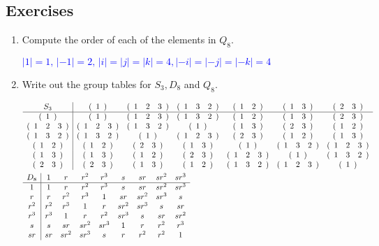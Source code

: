 \documentclass[10pt,a4paper]{report}
\newcommand{\BLUE}[1]{\textcolor{blue}{#1}}
\begin{document}
\subsection{Exercises}

\begin{enumerate}
	\item Compute the order of each of the elements in $Q_8$.
	
	\BLUE{$|1|=1,\,|-1|=2,\,|i|=|j|=|k|=4,|-i|=|-j|=|-k|=4$
	}
	
	\item Write out the group tables for $S_3, D_8$ and $Q_8$.
	
	\BLUE{
	\begin{align*}
		&\begin{array}{c|cccccc}
			S_3& \CYCLE{1} & \CYCLE{1&2&3} & \CYCLE{1&3&2} &\CYCLE{1&2}&\CYCLE{1&3}& \CYCLE{2&3} \\
			\hline
			\CYCLE{1} & \CYCLE{1} &\CYCLE{1&2&3} & \CYCLE{1&3&2} &\CYCLE{1&2}&\CYCLE{1&3}& \CYCLE{2&3} \\
			\CYCLE{1&2&3} & \CYCLE{1&2&3} & \CYCLE{1&3&2} & \CYCLE{1} & \CYCLE{1&3} & \CYCLE{2&3} & \CYCLE{1&2} \\
			\CYCLE{1&3&2} & \CYCLE{1&3&2} & \CYCLE{1} &\CYCLE{1&2&3} &\CYCLE{2&3} &\CYCLE{1&2} & \CYCLE{1&3}\\
			\CYCLE{1&2} & \CYCLE{1&2} & \CYCLE{2&3} & \CYCLE{1&3} & \CYCLE{1} &\CYCLE{1&3&2} & \CYCLE{1&2&3}\\
			\CYCLE{1&3} & \CYCLE{1&3} & \CYCLE{1&2} & \CYCLE{2&3} & \CYCLE{1&2&3} &\CYCLE{1}& \CYCLE{1&3&2}\\
			\CYCLE{2&3} & \CYCLE{2&3} & \CYCLE{1&3} & \CYCLE{1&2}& \CYCLE{1&3&2} &\CYCLE{1&2&3} & \CYCLE{1}
		\end{array}\\
		&\begin{array}{c|cccccccc}
			D_8 & 1     & r    & r^2  & r^3  & s   & sr   & sr^2 & sr^3\\
			\hline
			1    & 1    & r    & r^2  & r^3  & s   & sr   & sr^2  & sr^3\\ 
			r    & r    & r^2  & r^3  & 1    & sr  & sr^2 & sr^3 & s\\ 
			r^2  & r^2  & r^3  & 1    & r    & sr^2& sr^3 & s    & sr\\
			r^3  &r^3   & 1    & r    &r^2   & sr^3& s    & sr  & sr^2\\
			s    & s    & sr   & sr^2 &sr^3  & 1   & r    &  r^2 &  r^3\\
			sr   & sr   & sr^2  & sr^3& s    & r   & r^2  & r^2 & 1\\

\end{array}
\end{align*}}
\end{enumerate}
\end{document}
